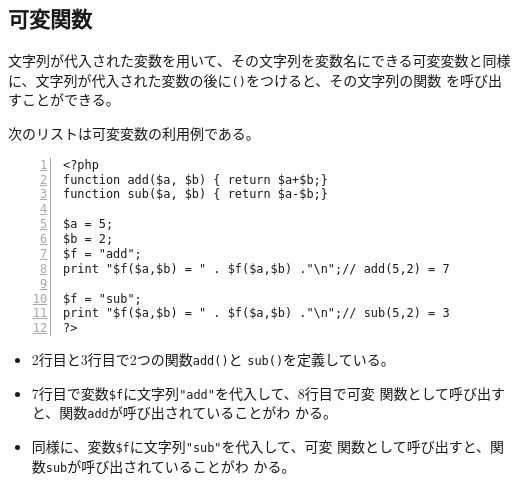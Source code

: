 \subsection{可変関数}
文字列が代入された変数を用いて、その文字列を変数名にできる可変変数と同様
に、文字列が代入された変数の後に\texttt{()}をつけると、その文字列の関数
を呼び出すことができる。
\begin{Exec}\upshape
次のリストは可変変数の利用例である。
\begin{Verbatim}[numbers=left]
<?php
function add($a, $b) { return $a+$b;}
function sub($a, $b) { return $a-$b;}

$a = 5;
$b = 2;
$f = "add";
print "$f($a,$b) = " . $f($a,$b) ."\n";// add(5,2) = 7

$f = "sub";
print "$f($a,$b) = " . $f($a,$b) ."\n";// sub(5,2) = 3
?>
\end{Verbatim}
\begin{itemize}\upshape
 \item 2行目と3行目で2つの関数\texttt{add()}と
       \texttt{sub()}を定義している。
 \item 7行目で変数\Verb+$f+に文字列\Verb+"add"+を代入して、8行目で可変
       関数として呼び出すと、関数\texttt{add}が呼び出されていることがわ
       かる。
 \item 同様に、変数\Verb+$f+に文字列\Verb+"sub"+を代入して、可変
       関数として呼び出すと、関数\texttt{sub}が呼び出されていることがわ
       かる。
\end{itemize}
\end{Exec}
\fi
